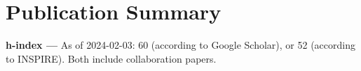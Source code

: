 \newcommand{\arxiv}[1]{[\href{http://arxiv.org/abs/#1}{arXiv:#1}]}
\def\zero{0}
\def\one{1}
\newcommand{\citeCount}[1]{%
  \def\val{#1}
  \ifx\val\zero%
  \else%
    \ifx\val\one%
    (1~citation)%
    \else%
    (#1~citations)%
    \fi%
  \fi}

\renewcommand{\citeCount}[1]{}


\setcounter{numPubs}{60}
\setcounter{pubCounter}{\value{numPubs}}


\newif\ifshowpubsummary
\showpubsummarytrue
\ifshowpubsummary
\section{\sc Publication Summary}
{\bf h-index ---}%
As of 2024-02-03: 60 (according to Google Scholar), or 52 (according
to INSPIRE).  Both include collaboration papers.

